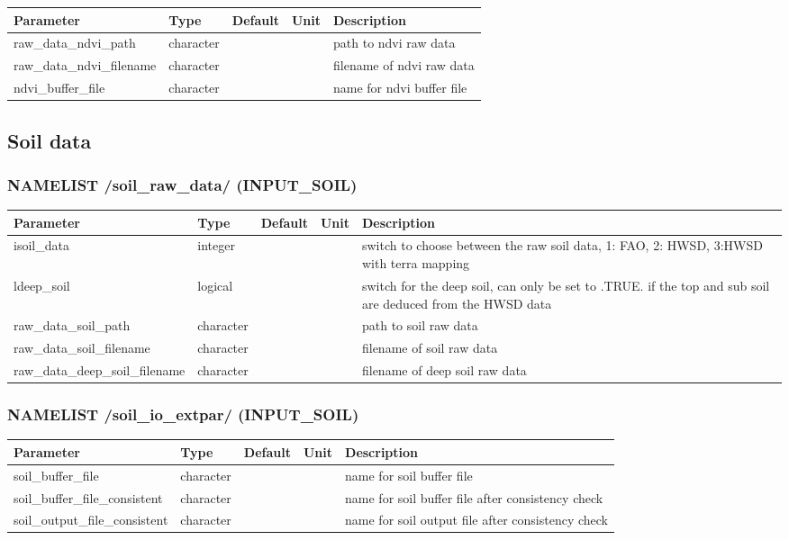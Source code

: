 \documentclass[a4paper,10pt,DIV14,BCOR1cm,titlepage,twoside]{scrartcl}
\providecommand{\tabularnewline}{\\}
\begin{document}
\begin{longtable}{|p{4cm}|p{1.5cm}|p{1.5cm}|p{1cm}|p{6cm}|}
\hline 
\textbf{Parameter}& \textbf{Type}& \textbf{Default}& \textbf{Unit}& \textbf{Description}
\tabularnewline
\hline
\endhead
\hline 
raw\_data\_ndvi\_path & character & &  & path to ndvi raw data \tabularnewline
\hline 
raw\_data\_ndvi\_filename & character & &  & filename of ndvi raw data \tabularnewline
\hline
ndvi\_buffer\_file & character & &  & name for ndvi buffer file
\tabularnewline
\hline 
\bottomrule
\end{longtable}

\subsection{Soil data}\label{namelist_input_for_extpar_soil}

\subsubsection*{NAMELIST /soil\_raw\_data/ (INPUT\_SOIL)}

\begin{longtable}{|p{4cm}|p{1.5cm}|p{1.5cm}|p{1cm}|p{6cm}|}
\hline 
\textbf{Parameter}& \textbf{Type}& \textbf{Default}& \textbf{Unit}& \textbf{Description}
\tabularnewline
\hline
\endhead
\hline
isoil\_data & integer & & & switch to choose between the raw soil data, 1: FAO, 2: HWSD, 3:HWSD with terra mapping \tabularnewline
\hline
ldeep\_soil & logical & & & switch for the deep soil, can only be set to .TRUE. if the top and sub soil are deduced from the HWSD data \tabularnewline
\hline
raw\_data\_soil\_path & character & &  & path to soil raw data \tabularnewline
\hline 
raw\_data\_soil\_filename & character & &  & filename of soil raw data \tabularnewline
\hline
raw\_data\_deep\_soil\_\-filename & character & &  & filename of deep soil raw data \tabularnewline
\hline
\bottomrule
\end{longtable}

\subsubsection*{NAMELIST /soil\_io\_extpar/ (INPUT\_SOIL)}
\begin{longtable}{|p{4cm}|p{1.5cm}|p{1.5cm}|p{1cm}|p{6cm}|}
\hline 
\textbf{Parameter}& \textbf{Type}& \textbf{Default}& \textbf{Unit}& \textbf{Description}
\tabularnewline
\hline
\endhead
\hline
soil\_buffer\_file & character & &  & name for soil buffer file
\tabularnewline
\hline
soil\_buffer\_file\_consistent & character & &  & name for soil buffer file after consistency check \tabularnewline
\hline
soil\_output\_file\_consistent & character & &  & name for soil output file after consistency check \tabularnewline
\hline
\bottomrule
\end{longtable}
\end{document}
